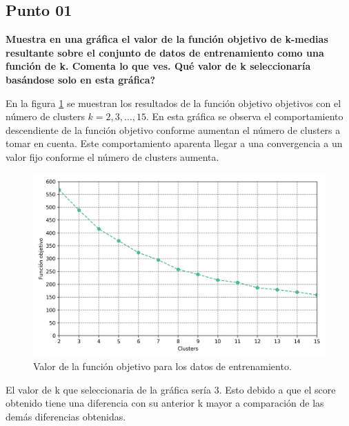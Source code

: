 \subsection*{Punto 01}

\textbf{Muestra en una gráfica el valor de la función objetivo de k-medias resultante sobre el conjunto de datos de entrenamiento como una función de k. Comenta lo que ves. Qué valor de k seleccionaría basándose solo en esta gráfica?}

En la figura \ref{fig:problema_03_train_scores} se muestran los resultados de la función objetivo objetivos con el número de clusters $k=2,3,\dots,15$. En esta gráfica se observa el comportamiento descendiente de la función objetivo conforme aumentan el número de clusters a tomar en cuenta. Este comportamiento aparenta llegar a una convergencia a un valor fijo conforme el número de clusters aumenta.

\begin{figure}[H]
    \centering
    \includegraphics[width=14cm]{Graphics/Problema_03/train_scores.png}
    \caption{Valor de la función objetivo para los datos de entrenamiento.}
    \label{fig:problema_03_train_scores}
\end{figure}

El valor de k que seleccionaria de la gráfica sería 3. Esto debido a que el score obtenido tiene una diferencia con su anterior k mayor a comparación de las demás diferencias obtenidas.